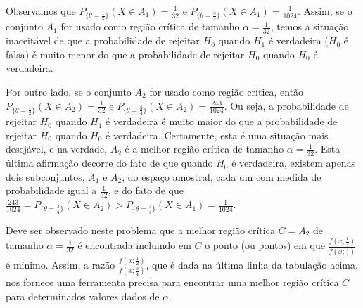 \documentclass[12pt]{beamer}
\begin{document}
\begin{frame}{}
\begin{block}{}
\justifying
Observamos que \(P_{\{\theta=\frac{1}{2}\}}(X \in A_1) = \frac{1}{32}\) e \(P_{\{\theta=\frac{3}{4}\}}(X \in A_1) = \frac{1}{1024}\). Assim, se o conjunto \(A_1\) for usado como região crítica de tamanho \(\alpha = \frac{1}{32}\), temos a situação inaceitável de que a probabilidade de rejeitar \(H_0\) quando \(H_1\) é verdadeira (\(H_0\) é falsa) é muito menor do que a probabilidade de rejeitar \(H_0\) quando \(H_0\) é verdadeira.
\end{block}
\end{frame}

\begin{frame}{}
\begin{block}{}
\justifying
Por outro lado, se o conjunto \(A_2\) for usado como região crítica, então \(P_{\{\theta=\frac{1}{2}\}}(X \in A_2) = \frac{1}{32}\) e \(P_{\{\theta=\frac{3}{4}\}}(X \in A_2) = \frac{243}{1024}\). Ou seja, a probabilidade de rejeitar \(H_0\) quando \(H_1\) é verdadeira é muito maior do que a probabilidade de rejeitar \(H_0\) quando \(H_0\) é verdadeira. Certamente, esta é uma situação mais desejável, e na verdade, \(A_2\) é a melhor região crítica de tamanho \(\alpha = \frac{1}{32}\). Esta última afirmação decorre do fato de que quando \(H_0\) é verdadeira, existem apenas dois subconjuntos, \(A_1\) e \(A_2\), do espaço amostral, cada um com medida de probabilidade igual a \(\frac{1}{32}\), e do fato de que \(\frac{243}{1024} = P_{\{\theta=\frac{3}{4}\}}(X \in A_2) > P_{\{\theta=\frac{3}{4}\}}(X \in A_1) = \frac{1}{1024}\).
\end{block}
\end{frame}

\begin{frame}{}
\begin{block}{}
\justifying
Deve ser observado neste problema que a melhor região crítica \(C = A_2\) de tamanho \(\alpha = \frac{1}{32}\) é encontrada incluindo em \(C\) o ponto (ou pontos) em que \(\frac{f(x;\frac{1}{2})}{f(x;\frac{3}{4})}\) é mínimo. Assim, a razão \(\frac{f(x;\frac{1}{2})}{f(x;\frac{3}{4})}\), que é dada na última linha da tabulação acima, nos fornece uma ferramenta precisa para encontrar uma melhor região crítica \(C\) para determinados valores dados de \(\alpha\). 
\end{block}
\end{frame}
\end{document}
